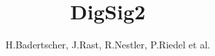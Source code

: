 \documentclass{scrartcl}
\title{DigSig2}
\author{H.Badertscher, J.Rast, R.Nestler, P.Riedel et al.}
\begin{document}
\setcounter{tocdepth}{2}

\maketitle
\newpage

\tableofcontents
\newpage


\begin{multicols}{2}

\newpage

\newpage

\end{multicols}





\end{document}
